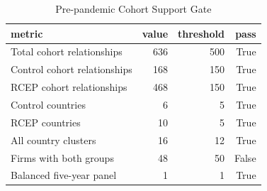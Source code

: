 \begin{table}
\caption{Pre-pandemic Cohort Support Gate}
\label{tab:table1_support_gate}
\begin{tabular}{lrrr}
\toprule
metric & value & threshold & pass \\
\midrule
Total cohort relationships & 636 & 500 & True \\
Control cohort relationships & 168 & 150 & True \\
RCEP cohort relationships & 468 & 150 & True \\
Control countries & 6 & 5 & True \\
RCEP countries & 10 & 5 & True \\
All country clusters & 16 & 12 & True \\
Firms with both groups & 48 & 50 & False \\
Balanced five-year panel & 1 & 1 & True \\
\bottomrule
\end{tabular}
\end{table}
